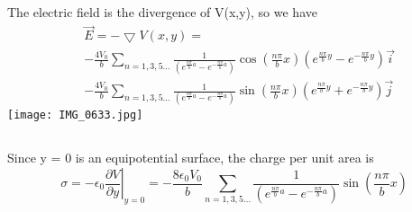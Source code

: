 \documentclass[10.5pt]{article}
\begin{document}
\normalsize
\subsection{}
The electric field is the divergence of V(x,y), so we have \LARGE\begin{equation}\label{eq:mti}
\begin{split}
    &\vec{E} = -\bigtriangledown V(x,y) =
    \\ & -\frac{4V_0}{b } \sum_{n=1,3,5\dots} \frac{1}{\left(e^{\frac{n\pi}{b}a}-e^{-\frac{n\pi}{b}a}\right)}\cos\left(\frac{n\pi}{b}x\right)\left(e^{\frac{n\pi}{b}y}-e^{-\frac{n\pi}{b}y}\right)\vec{i}
    \\ & -\frac{4V_0}{b } \sum _{n=1,3,5\dots} \frac{1}{\left(e^{\frac{n\pi}{b}a}-e^{-\frac{n\pi}{b}a}\right)}\sin\left(\frac{n\pi}{b}x\right)\left(e^{\frac{n\pi}{b}y}+e^{-\frac{n\pi}{b}y}\right)\vec{j}
\end{split}\end{equation}\indent\normalsize
\texttt{[image: IMG\_0633.jpg]}

\subsection{}
Since y = 0 is an equipotential surface, the charge per unit area is \LARGE$$\sigma = -\epsilon_0\left.\frac{\partial V}{\partial y} \right\lvert_{y=0} = -\frac{8\epsilon_0V_0}{ b} \sum_{n=1,3,5\dots}\frac{1}{\left(e^{\frac{n\pi}{b}a}-e^{-\frac{n\pi}{b}a}\right)}\sin\left(\frac{n\pi}{b}x\right)$$
\end{document}
